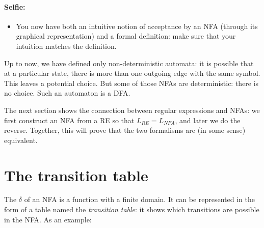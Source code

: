 
\newpage
\paragraph{Selfie:}
\begin{itemize}
\item[]
You now have both an intuitive notion of acceptance by an NFA (through
its graphical representation) and a formal definition: make sure that
your intuition matches the definition.
\end{itemize}


Up to now, we have defined only non-deterministic automata: it is
possible that at a particular state, there is more than one outgoing
edge with the same symbol. This leaves a potential choice. But some of
those NFAs are deterministic: there is no choice. Such an automaton is
a DFA.

The next section shows the connection between regular expressions and
NFAs: we first construct an NFA from a RE so that $L_{RE} = L_{NFA}$,
and later we do the reverse. Together, this will prove that the two
formalisms are (in some sense) equivalent.

\section{The transition table}

The $\delta$ of an NFA is a function with a finite domain. It can be
represented in the form of a table named the {\em transition table}:
it shows which transitions are possible in the NFA. As an example:

